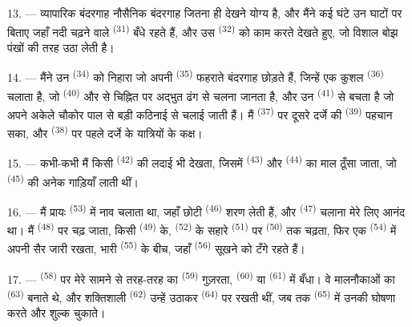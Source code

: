 13. --- व्यापारिक बंदरगाह नौसैनिक बंदरगाह जितना ही देखने योग्य है, और मैंने कई
घंटे उन घाटों पर बिताए जहाँ नदी चढ़ने वाले 
\textsuperscript{(31)} बँधे रहते हैं, और उस  \textsuperscript{(32)}
को काम करते देखते हुए, जो विशाल बोझ पंखों की तरह उठा लेती है।

\VUsaut{4.0mm}
\VUsaut{3.0mm}

14. --- मैंने उन  \textsuperscript{(34)} को निहारा
जो अपनी  \textsuperscript{(35)} फहराते बंदरगाह छोड़ते हैं, जिन्हें
एक कुशल  \textsuperscript{(36)} चलाता है, जो 
\textsuperscript{(40)} और  से चिह्नित  पर
अद्भुत ढंग से चलना जानता है, और उन  \textsuperscript{(41)} से
बचता है जो अपने अकेले चौकोर पाल से बड़ी कठिनाई से चलाई जाती हैं। मैं
 \textsuperscript{(37)} पर दूसरे दर्जे की 
\textsuperscript{(39)} पहचान सका, और  \textsuperscript{(38)} पर
पहले दर्जे के यात्रियों के कक्ष।

15. --- कभी-कभी मैं किसी  \textsuperscript{(42)} की लदाई भी
देखता, जिसमें  \textsuperscript{(43)} और 
\textsuperscript{(44)} का माल ठूँसा जाता, जो 
\textsuperscript{(45)} की अनेक गाड़ियाँ लाती थीं।

\VUsaut{3.0mm}
\VUsaut{3.0mm}

16. --- मैं प्रायः  \textsuperscript{(53)} में नाव चलाता था,
जहाँ छोटी  \textsuperscript{(46)} शरण लेती हैं, और 
\textsuperscript{(47)} चलाना मेरे लिए आनंद था। मैं 
\textsuperscript{(48)} पर चढ़ जाता, किसी 
\textsuperscript{(49)} के,
 \textsuperscript{(52)} के सहारे 
\textsuperscript{(51)} पर  \textsuperscript{(50)} तक चढ़ता,
फिर एक  \textsuperscript{(54)} में अपनी सैर जारी रखता, भारी
 \textsuperscript{(55)} के बीच, जहाँ 
\textsuperscript{(56)} सूखने को टँगे रहते हैं।

17. ---  \textsuperscript{(58)} पर मेरे सामने से तरह-तरह का
 \textsuperscript{(59)} गुज़रता,  \textsuperscript{(60)}
या  \textsuperscript{(61)} में बँधा। वे मालनौकाओं का
 \textsuperscript{(63)} बनाते थे, और शक्तिशाली 
\textsuperscript{(62)} उन्हें उठाकर  \textsuperscript{(64)} पर रखती
थीं, जब तक   \textsuperscript{(65)} में उनकी
घोषणा करते और शुल्क चुकाते।

